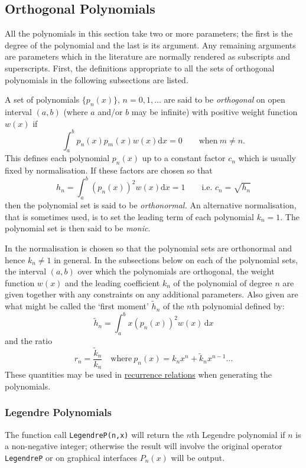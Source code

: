 \subsection{Orthogonal Polynomials}
\hypertarget{POLYFN}{}

All the polynomials in this section take two or more parameters; the first is
the degree of the polynomial and the last is its argument. Any remaining
arguments are parameters which in the literature are normally rendered as
subscripts and superscripts. First, the definitions appropriate to all the sets
of orthogonal polynomials in the following subsections are listed.

A set of polynomials $\{p_n(x)\},\, n=0,1,\ldots$
are said to be \emph{orthogonal} on open interval $(a, b)$
(where $a$ and/or $b$ may be infinite) with positive weight function $w(x)$ if
$$\int_a^b p_n(x)p_m(x)w(x) \mathrm{d}x = 0 \qquad \mbox{when}\ m \neq n.$$
This defines each polynomial $p_n(x)$ up to a constant factor $c_n$ which is
usually fixed by normalisation. If these factors are chosen so that
$$h_n=\int_a^b (p_n(x))^2 w(x) \mathrm{d}x = 1\qquad\mbox{i.e.\ }
c_n=\sqrt{h_n}$$
then the polynomial set is said to be \emph{orthonormal.}
An alternative normalisation, that is sometimes used, is to set the leading term
of each polynomial $k_n = 1$. The polynomial set is then said to be
\emph{monic}.

In \REDUCE the normalisation is chosen so that the polynomial
sets are orthonormal and hence $k_n \neq 1$ in general. In the subsections below
on each of the polynomial sets, the interval $(a,b)$ over which the polynomials
are orthogonal, the weight function $w(x)$ and the leading coefficient $k_n$ of
the polynomial of degree $n$ are given together with any constraints on any
additional parameters. Also given are what might be called the `first moment'
$\tilde{h}_n$ of the $n$th polynomial defined by:
$$\tilde{h}_n = \int_a^b x  (p_n(x))^2 w(x) \,\mathrm{d}x$$
and the ratio
$$r_n = \frac{\tilde{k}_n}{k_n}\quad\mbox{where}\ p_n(x) =
k_n x^n + \tilde{k}_n x^{n-1} \ldots$$
These quantities may be used in \href{https://dlmf.nist.gov/18.2#iv}
{recurrence relations} when generating the polynomials.

\subsubsection{Legendre Polynomials}
\hypertarget{LEGENDREP}{}
The function call \texttt{LegendreP(n,x)} will return the $n$th Legendre
polynomial if $n$ is a non-negative integer; otherwise the result will involve
the original operator \texttt{LegendreP} or on graphical interfaces $P_n(x)$
will be output.

